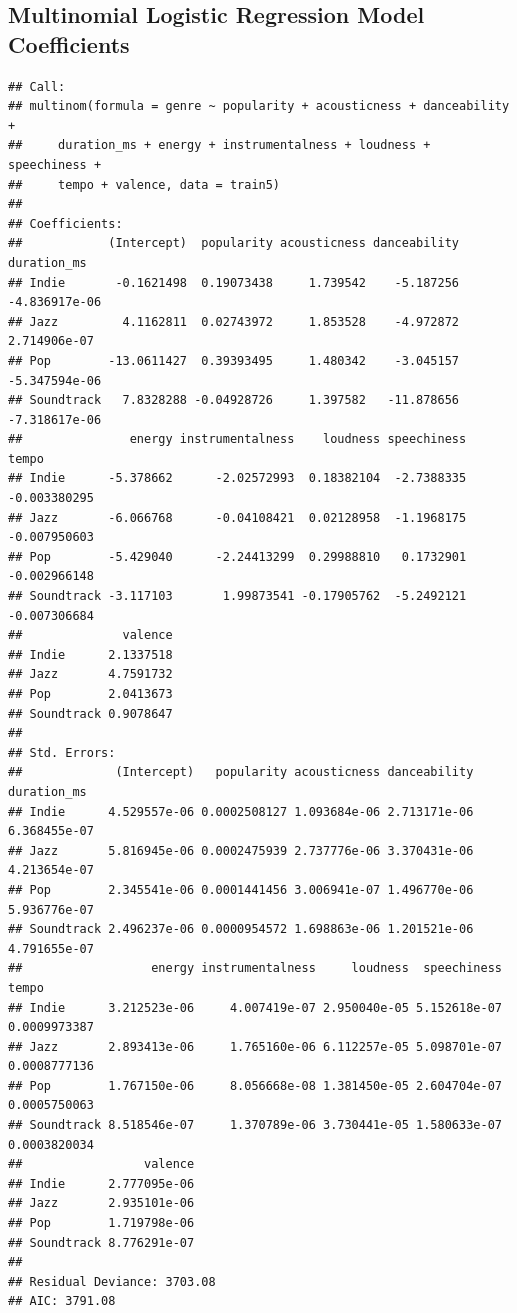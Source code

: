 \documentclass[
]{article}
\begin{document}
\hypertarget{multinomial-logistic-regression-model-coefficients}{%
\subsection{Multinomial Logistic Regression Model
Coefficients}\label{multinomial-logistic-regression-model-coefficients}}

\begin{verbatim}
## Call:
## multinom(formula = genre ~ popularity + acousticness + danceability + 
##     duration_ms + energy + instrumentalness + loudness + speechiness + 
##     tempo + valence, data = train5)
## 
## Coefficients:
##            (Intercept)  popularity acousticness danceability   duration_ms
## Indie       -0.1621498  0.19073438     1.739542    -5.187256 -4.836917e-06
## Jazz         4.1162811  0.02743972     1.853528    -4.972872  2.714906e-07
## Pop        -13.0611427  0.39393495     1.480342    -3.045157 -5.347594e-06
## Soundtrack   7.8328288 -0.04928726     1.397582   -11.878656 -7.318617e-06
##               energy instrumentalness    loudness speechiness        tempo
## Indie      -5.378662      -2.02572993  0.18382104  -2.7388335 -0.003380295
## Jazz       -6.066768      -0.04108421  0.02128958  -1.1968175 -0.007950603
## Pop        -5.429040      -2.24413299  0.29988810   0.1732901 -0.002966148
## Soundtrack -3.117103       1.99873541 -0.17905762  -5.2492121 -0.007306684
##              valence
## Indie      2.1337518
## Jazz       4.7591732
## Pop        2.0413673
## Soundtrack 0.9078647
## 
## Std. Errors:
##             (Intercept)   popularity acousticness danceability  duration_ms
## Indie      4.529557e-06 0.0002508127 1.093684e-06 2.713171e-06 6.368455e-07
## Jazz       5.816945e-06 0.0002475939 2.737776e-06 3.370431e-06 4.213654e-07
## Pop        2.345541e-06 0.0001441456 3.006941e-07 1.496770e-06 5.936776e-07
## Soundtrack 2.496237e-06 0.0000954572 1.698863e-06 1.201521e-06 4.791655e-07
##                  energy instrumentalness     loudness  speechiness        tempo
## Indie      3.212523e-06     4.007419e-07 2.950040e-05 5.152618e-07 0.0009973387
## Jazz       2.893413e-06     1.765160e-06 6.112257e-05 5.098701e-07 0.0008777136
## Pop        1.767150e-06     8.056668e-08 1.381450e-05 2.604704e-07 0.0005750063
## Soundtrack 8.518546e-07     1.370789e-06 3.730441e-05 1.580633e-07 0.0003820034
##                 valence
## Indie      2.777095e-06
## Jazz       2.935101e-06
## Pop        1.719798e-06
## Soundtrack 8.776291e-07
## 
## Residual Deviance: 3703.08 
## AIC: 3791.08
\end{verbatim}
\end{document}
